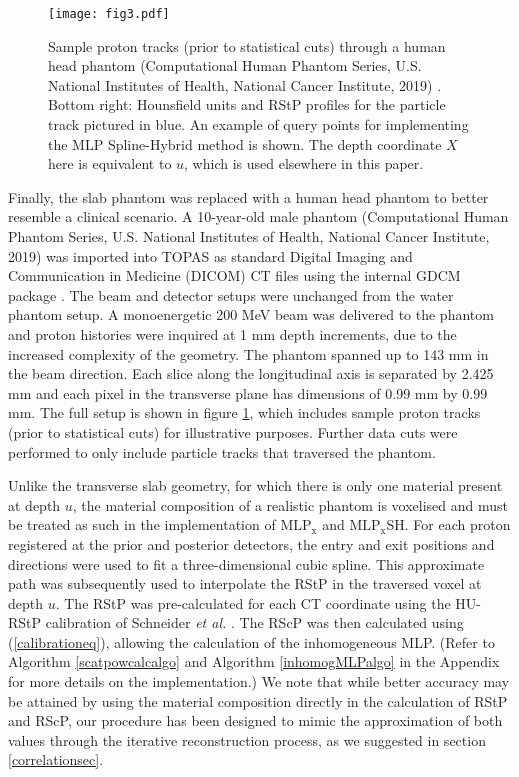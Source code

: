 \documentclass[preprint,times]{elsarticle}
\newcommand{\Fig}[1]{figure #1} %
\begin{document}
\begin{figure}[t]
\centering
\texttt{[image: fig3.pdf]}
\caption{Sample proton tracks (prior to statistical cuts) through a human head phantom (Computational Human Phantom Series, U.S. National Institutes of Health, National Cancer Institute, 2019) \citep{Lee2010,Lee2015}. Bottom right: Hounsfield units and RStP profiles for the particle track pictured in blue. An example of query points for implementing the MLP Spline-Hybrid method is shown. The depth coordinate $X$ here is equivalent to $u$, which is used elsewhere in this paper.}\label{headphantom}
\end{figure}

Finally, the slab phantom was replaced with a human head phantom to better resemble a clinical scenario. A 10-year-old male phantom (Computational Human Phantom Series, U.S. National Institutes of Health, National Cancer Institute, 2019) \citep{Lee2010,Lee2015} was imported into TOPAS as standard Digital Imaging and Communication in Medicine (DICOM) CT files using the internal GDCM package \citep{TOPAS}. The beam and detector setups were unchanged from the water phantom setup. A monoenergetic 200 MeV beam was delivered to the phantom and proton histories were inquired at 1 mm depth increments, due to the increased complexity of the geometry. The phantom spanned up to 143 mm in the beam direction. Each slice along the longitudinal axis is separated by 2.425 mm and each pixel in the transverse plane has dimensions of 0.99 mm by 0.99 mm. The full setup is shown in \Fig{\ref{headphantom}}, which includes sample proton tracks (prior to statistical cuts) for illustrative purposes. Further data cuts were performed to only include particle tracks that traversed the phantom.

Unlike the transverse slab geometry, for which there is only one material present at depth $u$, the material composition of a realistic phantom is voxelised and must be treated as such in the implementation of $\mathrm{MLP}_\mathrm{x}$ and $\mathrm{MLP}_\mathrm{x}$SH. For each proton registered at the prior and posterior detectors, the entry and exit positions and directions were used to fit a three-dimensional cubic spline. This approximate path was subsequently used to interpolate the RStP in the traversed voxel at depth $u$. The RStP was pre-calculated for each CT coordinate using the HU-RStP calibration of Schneider \emph{et al.} \citep{schneideretal}. The RScP was then calculated using (\ref{calibrationeq}), allowing the calculation of the inhomogeneous MLP. (Refer to Algorithm \ref{scatpowcalcalgo} and Algorithm \ref{inhomogMLPalgo} in the Appendix for more details on the implementation.) We note that while better accuracy may be attained by using the material composition directly in the calculation of RStP and RScP, our procedure has been designed to mimic the approximation of both values through the iterative reconstruction process, as we suggested in section \ref{correlationsec}.
\end{document}
